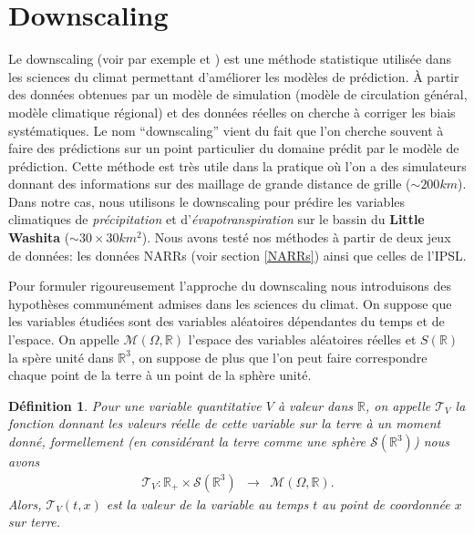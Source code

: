 \documentclass[a4paper,10pt]{article}
\newtheorem{definition}{Définition}
\begin{document}
	\newpage
	\tableofcontents
	\newpage
	
	\section{Downscaling}
	\label{dwnsc}
	Le downscaling (voir par exemple \cite{vrac2012dynamical} et \cite{ayar2016intercomparison}) est une méthode statistique utilisée dans les sciences du climat permettant d'améliorer les modèles de prédiction. À partir des données obtenues par un modèle de simulation (modèle de circulation général, modèle climatique régional) et des données réelles on cherche à corriger les biais systématiques. Le nom ``downscaling'' vient du fait que l'on cherche souvent à faire des prédictions sur un point particulier du domaine prédit par le modèle de prédiction. Cette méthode est très utile dans la pratique où l'on a des simulateurs donnant des informations sur des maillage de grande distance de grille ($\sim 200km$). Dans notre cas, nous utilisons le downscaling pour prédire les variables climatiques de \textit{précipitation} et d'\textit{évapotranspiration} sur le bassin du \textbf{Little Washita} ($\sim 30\times30 km^2$). Nous avons testé nos méthodes à partir de deux jeux de données: les données NARRs (voir section \ref{NARRs}) ainsi que celles de l'IPSL.
	
	Pour formuler rigoureusement l'approche du downscaling nous introduisons des hypothèses communément admises dans les sciences du climat. On suppose que les variables étudiées sont des variables aléatoires dépendantes du temps et de l'espace. On appelle $\mathcal{M}(\Omega,\mathbb{R})$ l'espace des variables aléatoires réelles et $S(\mathbb{R})$ la spère unité dans $\mathbb{R}^3$, on suppose de plus que l'on peut faire correspondre chaque point de la terre à un point de la sphère unité.
	
	\begin{definition}
		\label{terre}
		Pour une variable quantitative $V$ à valeur dans $\mathbb{R}$, on appelle $\mathcal{T}_V$ la fonction donnant les  valeurs réelle de cette variable sur la terre à un moment donné, formellement (en considérant la terre comme une sphère $\mathcal{S}(\mathbb{R}^3)$) nous avons
		\begin{equation}
			\begin{array}{ccc}
				\mathcal{T}_V: \mathbb{R}_{+}\times\mathcal{S}(\mathbb{R}^{3}) & \to & \mathcal{M}(\Omega,\mathbb{R}).
			\end{array}
		\end{equation}
		Alors, $\mathcal{T}_V(t,x)$ est la valeur de la variable au temps $t$ au point de coordonnée $x$ sur terre.	
	\end{definition}
	
\end{document}
